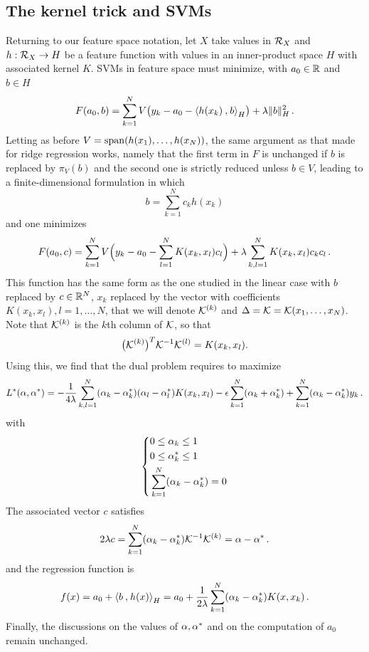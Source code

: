 \subsection{The kernel trick and SVMs}
Returning to our feature space notation, let $X$ take values in ${\mathcal R}_X$ and $h: {\mathcal R}_X \to H$ be a feature function with values in an inner-product space $H$ with associated kernel $K$. SVMs in feature space must minimize, with ${a_0}\in {\mathbb{R}}$ and $b\in H$
$$ 
F({a_0}, b) = \sum_{k=1}^N V\big(y_k - {a_0} - {\langle {h(x_k)}\mathbin{,} {b}\rangle}_H\big) + \lambda \|b\|_H^2\,.
$$
Letting as before $V = \mathrm{span}(h(x_1), \ldots, h(x_N))$, the same argument as that made for ridge regression works, namely that the first term in $F$ is unchanged if $b$ is replaced by $\pi_V(b)$ and the second one is strictly reduced unless $b\in V$, leading to a finite-dimensional formulation in which 
\[
b = \sum_{k=1}^N c_k h(x_k)
\]
and one minimizes
$$ 
F({a_0}, c) = \sum_{k=1}^N V\Big(y_k - {a_0} - \sum_{l=1}^N K(x_k,x_l) c_l\Big) + \lambda \sum_{k,l=1}^N K(x_k,x_l) c_kc_l \,.
$$
This function has the same form as the one studied in the linear case with $b$ replaced by $c \in {\mathbb{R}}^N$, $x_k$ replaced by the vector with coefficients $K(x_k, x_l), l=1, \ldots, N$, that we will denote ${\mathcal K}^{(k)}$ and $\Delta = {\mathcal K} = {\mathcal K}(x_1, \ldots, x_N)$. Note that ${\mathcal K}^{(k)}$ is the $k$th column of ${\mathcal K}$, so that 
\[
\big({\mathcal K}^{(k)}\big)^T {\mathcal K}^{-1} {\mathcal K}^{(l)} = K(x_k, x_l).
\]
Using this, we find that the dual problem requires  to maximize
$$
L^*(\alpha, \alpha^*) = -\frac{1}{4\lambda} \sum_{k,l=1}^N
(\alpha_k-\alpha_k^*)(\alpha_l-\alpha_l^*) K(x_k, x_l) - \epsilon \sum_{k=1}^N
(\alpha_k+\alpha_k^*) + \sum_{k=1}^N (\alpha_k-\alpha_k^*)y_k\,.
$$
with
$$
\left\{
\begin{aligned}
&0\leq \alpha_k \leq 1 \\
&0 \leq  \alpha_k^* \leq 1 \\
&\sum_{k=1}^N (\alpha_k-\alpha_k^*) = 0 \\
\end{aligned}
\right.
$$
The associated vector $c$ satisfies
\[
2 \lambda c =  \sum_{k=1}^N (\alpha_k-\alpha_k^*) {\mathcal K}^{-1} {\mathcal K}^{(k)} = \alpha - \alpha^*\,.
\]
and the regression function is
\[
f(x) = {a_0} + {\langle {b}\mathbin{,} {h(x)}\rangle}_H = {a_0} + \frac{1}{2\lambda} \sum_{k=1}^N (\alpha_k-\alpha_k^*)  K(x, x_k)\,.
\]
Finally, the discussions on the values of $\alpha, \alpha^*$ and on the computation of ${a_0}$ remain unchanged.





